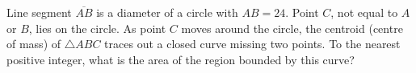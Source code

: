 Line segment $\overline{AB}$ is a diameter of a circle with $AB=24$. Point $C$, not equal to $A$ or $B$, lies on the circle. As point $C$ moves around the circle, the centroid (centre of mass) of $\triangle ABC$ traces out a closed curve missing two points. To the nearest positive integer, what is the area of the region bounded by this curve?
